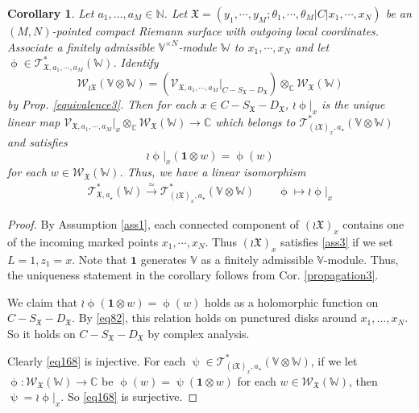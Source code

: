 \documentclass[11pt,b5paper,notitlepage]{article}
\theoremstyle{definition}
\theoremstyle{plain}
\newtheorem{co}[df]{Corollary}
\newcommand{\fk}{\mathfrak}
\newcommand{\idt}{\mathbf{1}}
\newcommand{\SV}{\mathscr{V}}
\newcommand{\scr}{\mathscr}
\newcommand{\Vbb}{\mathbb V}
\newcommand{\Wbb}{\mathbb W}
\newcommand{\Cbb}{\mathbb C}
\newcommand{\Nbb}{\mathbb N}
\newcommand{\ibf}{\mathbf 1}
\newcommand{\<}{\left\langle}
\renewcommand{\>}{\right\rangle}
\newcommand{\fx}{\mathfrak{X}}
\newcommand{\ST}{\mathscr{T}}
\newcommand{\SW}{\mathscr{W}}
\numberwithin{equation}{section}
\begin{document}
\begin{co}\label{propagation5}
Let $a_1,\dots,a_M\in\Nbb$. Let $\fx=(y_1,\cdots,y_M;\theta_1,\cdots,\theta_M\big|C\big|x_1,\cdots,x_N)$ be an $(M,N)$-pointed compact Riemann surface with outgoing local coordinates. Associate a finitely admissible $\Vbb^{\times N}$-module $\Wbb$ to $x_1,\cdots,x_N$ and let $\upphi\in \ST_{\fx,a_1,\cdots,a_M}^*(\Wbb)$. Identify
$$
 \SW_{\wr\fx}(\Vbb\otimes \Wbb)=(\SV_{\fx,a_1,\cdots,a_M}\vert_{C-S_\fx-D_\fx})\otimes_\Cbb \SW_\fx(\Wbb)
$$
by Prop. \ref{equivalence3}. Then for each $x\in C-S_\fx-D_\fx$, $\wr\upphi\vert_x$ is the unique linear map $\SV_{\fx,a_1,\cdots,a_M}\vert_x\otimes_\Cbb \SW_\fx(\Wbb)\rightarrow \Cbb$ which belongs to $\scr T_{(\wr\fk X)_x,a_\star}^*(\Vbb\otimes\Wbb)$ and satisfies 
\begin{equation}\label{eq51}
\wr\upphi\vert_x(\ibf\otimes w)=\upphi(w)
\end{equation}
for each $w\in \SW_\fx(\Wbb)$. Thus, we have a linear isomorphism
\begin{gather}
\scr T_{\fx,a_\star}^*(\Wbb)\xrightarrow{\simeq}\scr T_{(\wr\fx)_x,a_\star}^*(\Vbb\otimes\Wbb)\qquad\upphi\mapsto \wr\upphi|_x  \label{eq168}
\end{gather}
\end{co}
\begin{proof}
By Assumption \ref{ass1}, each connected component of $(\wr\fk X)_x$ contains one of the incoming marked points $x_1,\cdots,x_N$. Thus $(\wr\fx)_x$ satisfies  \eqref{ass3} if we set $L=1,z_1=x$. Note that $\ibf$ generates $\Vbb$ as a finitely admissible $\Vbb$-module. Thus, the uniqueness statement in the corollary follows from Cor. \ref{propagation3}.
     
We claim that $\wr\upphi(\ibf\otimes w)=\upphi(w)$ holds as a holomorphic function on $C-S_\fx-D_\fx$. By \eqref{eq82}, this relation holds on punctured disks around $x_1,\dots,x_N$. So it holds on $C-S_\fx-D_\fx$ by complex analysis.

Clearly \eqref{eq168} is injective. For each $\uppsi\in\scr T_{(\wr\fx)_x,a_\star}^*(\Vbb\otimes\Wbb)$, if we let $\upphi:\scr W_\fx(\Wbb)\rightarrow\Cbb$ be $\upphi(w)=\uppsi(\idt\otimes w)$ for each $w\in\scr W_\fx(\Wbb)$, then $\uppsi=\wr\upphi|_x$. So \eqref{eq168} is surjective.
\end{proof}
\end{document}
